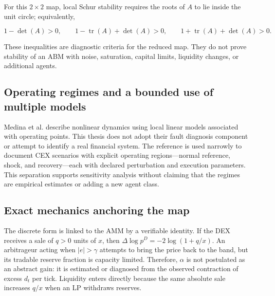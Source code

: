 For this $2\times2$ map, local Schur stability requires the roots of $A$ to lie
inside the unit circle; equivalently,

\begin{equation}
  1-\det(A)>0,\qquad
  1-\operatorname{tr}(A)+\det(A)>0,\qquad
  1+\operatorname{tr}(A)+\det(A)>0.
\end{equation}

These inequalities are diagnostic criteria for the reduced map. They do not prove
stability of an ABM with noise, saturation, capital limits, liquidity changes, or
additional agents.

\subsection{Operating regimes and a bounded use of multiple models}

Medina et al. \cite{medina2009multimodelos} describe nonlinear dynamics using local
linear models associated with operating points. This thesis does not adopt their fault
diagnosis component or attempt to identify a real financial system. The reference is
used narrowly to document CEX scenarios with explicit operating regions---normal
reference, shock, and recovery---each with declared perturbation and execution
parameters. This separation supports sensitivity analysis without claiming that the
regimes are empirical estimates or adding a new agent class.

\subsection{Exact mechanics anchoring the map}

The discrete form is linked to the AMM by a verifiable identity. If the DEX receives
a sale of $q>0$ units of $x$, then
$\Delta\log p^D=-2\log(1+q/x)$. An arbitrageur acting when $|e|>\gamma$ attempts to
bring the price back to the band, but its tradable reserve fraction is capacity
limited. Therefore, $\alpha$ is not postulated as an abstract gain: it is estimated or
diagnosed from the observed contraction of excess $d_t$ per tick. Liquidity enters
directly because the same absolute sale increases $q/x$ when an LP withdraws reserves.
